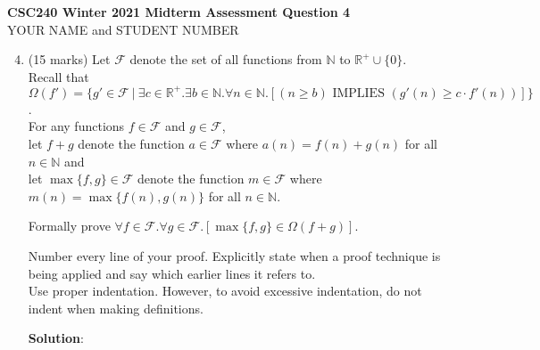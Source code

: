 \documentclass[11pt]{article}
\newcommand{\Implies}{\mbox{ IMPLIES }}
\def\reals{{\mathbb R}}
\def\nats{{\mathbb N}}
\newcounter{ind}
\begin{document}
\begin{center}
{\bf \Large \bf CSC240 Winter 2021 Midterm Assessment Question 4}\\
YOUR NAME and STUDENT NUMBER
\end{center}

\medskip

\begin{enumerate}
\setcounter{enumi}{3}

\item
\begin{question}
(15 marks)
Let $\mathscr{F}$ denote the set of all functions from $\nats$ to $\reals^+ \cup \{0\}$.\\
Recall that $\Omega(f') = \{g' \in \mathscr{F} \ |\ \exists c \in \reals^+.\exists b \in \nats. \forall n \in \nats.
[(n \geq b) \Implies (g'(n) \geq c \cdot  f'(n))]\}$.\\
For any functions $f \in \mathscr{F}$ and $g \in \mathscr{F}$,\\
let $f+g$ denote the function $a \in \mathscr{F}$
where $a(n) = f(n)+g(n)$ for all $n \in \nats$ and\\
let $\max\{f,g\} \in \mathscr{F}$ denote the function $m \in \mathscr{F}$
where $m(n) = \max\{f(n),g(n)\}$ for all $n \in \nats$.

Formally prove $\forall f \in \mathscr{F}. \forall g \in \mathscr{F}.[ \max\{f,g\} \in \Omega(f+g)]$.

Number every line of your proof.
Explicitly state when a proof technique is being applied and say which earlier lines it refers to.\\
Use proper indentation. However,
to avoid excessive indentation, do not indent when making definitions.
\end{question}


\begin{solution}
{\bf Solution}:

\end{solution}
\end{enumerate}
\end{document}
